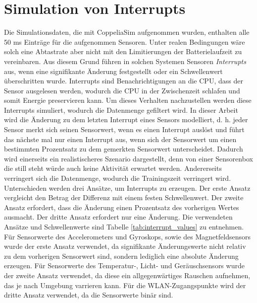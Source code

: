 \section{Simulation von Interrupts}
Die Simulationsdaten, die mit CoppeliaSim aufgenommen wurden, enthalten alle 50 ms Einträge für die aufgenommen Sensoren.
Unter realen Bedingungen wäre solch eine Abtastrate aber nicht mit den Limitierungen der Batterielaufzeit zu vereinbaren.
Aus diesem Grund führen in solchen Systemen Sensoren \textit{Interrupts} aus, wenn eine signifikante Änderung festgestellt oder ein Schwellenwert überschritten wurde.
Interrupts sind Benachrichtigungen an die CPU, dass der Sensor ausgelesen werden, wodurch die CPU in der Zwischenzeit schlafen und somit Energie preservieren kann.
\newline
\newline
Um dieses Verhalten nachzustellen werden diese Interrupts simuliert, wodurch die Datenmenge gefiltert wird.
In dieser Arbeit wird die Änderung zu dem letzten Interrupt eines Sensors modelliert,
d. h. jeder Sensor merkt sich seinen Sensorwert, wenn es einen Interrupt auslöst
und führt das nächste mal nur einen Interrupt aus, wenn sich der Sensorwert um einen bestimmten Prozentsatz zu dem gemerkten Sensorwert unterscheidet.
\newpage
Dadurch wird einerseits ein realistischeres Szenario dargestellt,
denn von einer Sensorenbox die still steht würde auch keine Aktivität erwartet werden.
Andererseits verringert sich die Datenmenge, wodurch die Trainingszeit verringert wird.
\newline
\newline
Unterschieden werden drei Ansätze, um Interrupts zu erzeugen.
Der erste Ansatz vergleicht den Betrag der Differenz mit einem festen Schwellenwert.
Der zweite Ansatz erfordert, dass die Änderung einen Prozentsatz des vorherigen Wertes ausmacht.
Der dritte Ansatz erfordert nur eine Änderung.
\newline
\newline
Die verwendeten Ansätze und Schwellenwerte sind Tabelle \ref{tab:interrupt_values} zu entnehmen.
Für Sensorwerte des Accelerometers und Gyroskops, sowie des Magnetfeldsensors wurde der erste Ansatz verwendet,
da signifikante Änderungswerte nicht relativ zu dem vorherigen Sensorwert sind, sondern lediglich eine absolute Änderung erzeugen.
Für Sensorwerte des Temperatur-, Licht- und Geräuschsensors wurde der zweite Ansatz verwendet,
da diese ein allgegenwärtiges Rauschen aufnehmen, das je nach Umgebung varrieren kann.
Für die WLAN-Zugangspunkte wird der dritte Ansatz verwendet, da die Sensorwerte binär sind.
